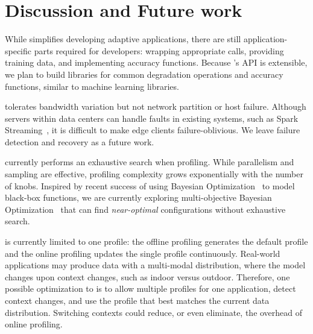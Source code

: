 \section{Discussion and Future work}
\label{sec:discussion}

 While \sysname{} simplifies developing
adaptive applications, there are still application-specific parts required for
developers: wrapping appropriate \maybe{} calls, providing training data, and
implementing accuracy functions. Because \sysname{}'s API is extensible, we plan
to build libraries for common degradation operations and accuracy functions,
similar to machine learning libraries.

 \sysname{} tolerates bandwidth variation
but not network partition or host failure. Although servers within data centers
can handle faults in existing systems, such as Spark
Streaming~\cite{zaharia2013discretized}, it is difficult to make edge clients
failure-oblivious.  We leave failure detection and recovery as a future work.

 \sysname{} currently performs an exhaustive search when
profiling. While parallelism and sampling are effective, profiling complexity
grows exponentially with the number of knobs. Inspired by recent success of
using Bayesian Optimization~\cite{snoek2012practical, alipourfard2017cherrypick,
  solnik2017bayesian} to model black-box functions, we are currently exploring
multi-objective Bayesian Optimization~\cite{hernandez2016predictive} that can
find \textit{near-optimal} configurations without exhaustive search.


 \sysname{} is currently limited to one profile: the
offline profiling generates the default profile and the online profiling
updates the single profile continuously.  Real-world applications may produce
data with a multi-modal distribution, where the model changes upon context
changes, such as indoor versus outdoor. Therefore, one possible optimization
to \sysname{} is to allow multiple profiles for one application, detect
context changes, and use the profile that best matches the current data
distribution.  Switching contexts could reduce, or even eliminate, the
overhead of online profiling.

